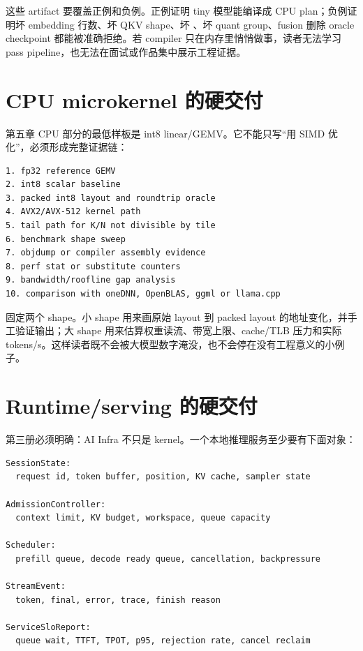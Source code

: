 这些 artifact 要覆盖正例和负例。正例证明 tiny 模型能编译成 CPU plan；负例证明坏 embedding 行数、坏 QKV shape、坏 、坏 quant group、fusion 删除 oracle checkpoint 都能被准确拒绝。若 compiler 只在内存里悄悄做事，读者无法学习 pass pipeline，也无法在面试或作品集中展示工程证据。

\section*{CPU microkernel 的硬交付}

第五章 CPU 部分的最低样板是 int8 linear/GEMV。它不能只写“用 SIMD 优化”，必须形成完整证据链：

\begin{lstlisting}[numbers=none,caption={CPU int8 linear 样板交付}]
1. fp32 reference GEMV
2. int8 scalar baseline
3. packed int8 layout and roundtrip oracle
4. AVX2/AVX-512 kernel path
5. tail path for K/N not divisible by tile
6. benchmark shape sweep
7. objdump or compiler assembly evidence
8. perf stat or substitute counters
9. bandwidth/roofline gap analysis
10. comparison with oneDNN, OpenBLAS, ggml or llama.cpp
\end{lstlisting}

固定两个 shape。小 shape  用来画原始 layout 到 packed layout 的地址变化，并手工验证输出；大 shape  用来估算权重读流、带宽上限、cache/TLB 压力和实际 tokens/s。这样读者既不会被大模型数字淹没，也不会停在没有工程意义的小例子。

\section*{Runtime/serving 的硬交付}

第三册必须明确：AI Infra 不只是 kernel。一个本地推理服务至少要有下面对象：

\begin{lstlisting}[numbers=none,caption={serving runtime 最小对象}]
SessionState:
  request id, token buffer, position, KV cache, sampler state

AdmissionController:
  context limit, KV budget, workspace, queue capacity

Scheduler:
  prefill queue, decode ready queue, cancellation, backpressure

StreamEvent:
  token, final, error, trace, finish reason

ServiceSloReport:
  queue wait, TTFT, TPOT, p95, rejection rate, cancel reclaim
\end{lstlisting}

